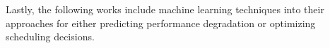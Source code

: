 
Lastly, the following works include machine learning techniques into their approaches for either predicting performance degradation or optimizing scheduling decisions.

